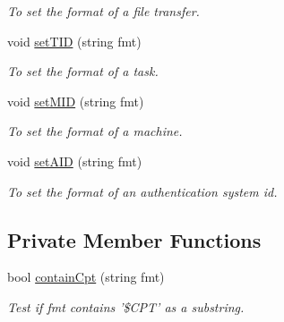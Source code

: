 \begin{DoxyCompactItemize}
\begin{DoxyCompactList}\small\item\em To set the format of a file transfer. \item\end{DoxyCompactList}\item 
\hypertarget{classObjectIdServer_a9031c571c75348149c32631091b0d2f4}{
void \hyperlink{classObjectIdServer_a9031c571c75348149c32631091b0d2f4}{setTID} (string fmt)}
\label{classObjectIdServer_a9031c571c75348149c32631091b0d2f4}

\begin{DoxyCompactList}\small\item\em To set the format of a task. \item\end{DoxyCompactList}\item 
\hypertarget{classObjectIdServer_af23fa4159483ad6ec2b652360fa30944}{
void \hyperlink{classObjectIdServer_af23fa4159483ad6ec2b652360fa30944}{setMID} (string fmt)}
\label{classObjectIdServer_af23fa4159483ad6ec2b652360fa30944}

\begin{DoxyCompactList}\small\item\em To set the format of a machine. \item\end{DoxyCompactList}\item 
\hypertarget{classObjectIdServer_a7ed2e0b4ed52efdbbb9baae2746d1983}{
void \hyperlink{classObjectIdServer_a7ed2e0b4ed52efdbbb9baae2746d1983}{setAID} (string fmt)}
\label{classObjectIdServer_a7ed2e0b4ed52efdbbb9baae2746d1983}

\begin{DoxyCompactList}\small\item\em To set the format of an authentication system id. \item\end{DoxyCompactList}\end{DoxyCompactItemize}
\subsection*{Private Member Functions}
\begin{DoxyCompactItemize}
\item 
bool \hyperlink{classObjectIdServer_aca4b3a6b6ac76ce51b72332ead290783}{containCpt} (string fmt)
\begin{DoxyCompactList}\small\item\em Test if fmt contains '\$CPT' as a substring. \item\end{DoxyCompactList}\end{DoxyCompactItemize}
